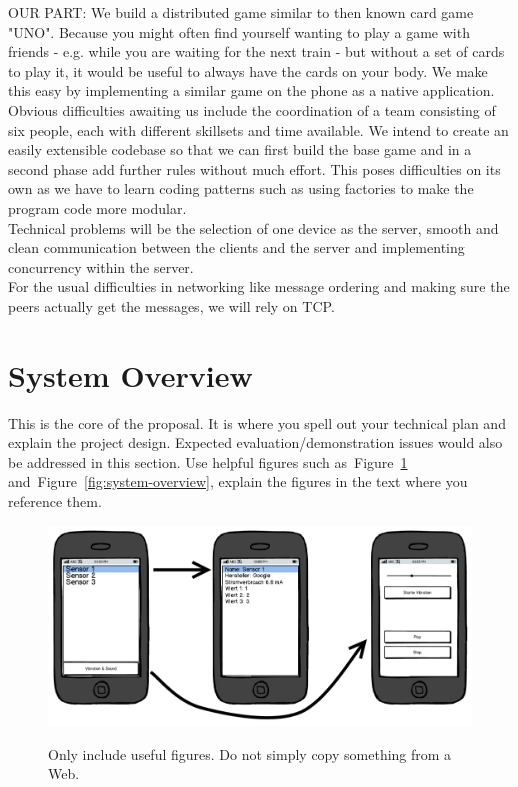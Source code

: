 \documentclass{report}
\newcommand{\lfig}[1]{\label{fig:#1}}
\newcommand{\rfig}[1]{Figure~\ref{fig:#1}}
\begin{document}
OUR PART:
We build a distributed game similar to then known card game "UNO". Because you might often find yourself wanting to play a game with friends - e.g. while you are waiting for the next train - but without a set of cards to play it, it would be useful to always have the cards on your body. We make this easy by implementing a similar game on the phone as a native application.\\

Obvious difficulties awaiting us include the coordination of a team consisting of six people, each with different skillsets and time available.
We intend to create an easily extensible codebase so that we can first build the base game and in a second phase add further rules without much effort. This poses difficulties on its own as we have to learn coding patterns such as using factories to make the program code more modular.\\
Technical problems will be the selection of one device as the server, smooth and clean communication between the clients and the server and implementing concurrency within the server.\\

For the usual difficulties in networking like message ordering and making sure the peers actually get the messages, we will rely on TCP.


\section{System Overview}

This is the core of the proposal.
It is where you spell out your technical plan and explain the project design.
Expected evaluation/demonstration issues would also be addressed in this section.
Use helpful figures such as~\rfig{example} and~\rfig{system-overview},
explain the figures in the text where you reference them. 


\begin{figure}[h]
	\centering
    \includegraphics[width=\columnwidth]{example}
    \lfig{example}
    \vspace{-5mm} %
	\caption{Only include useful figures. Do not simply copy something from a Web.}
\end{figure}
\end{document}
